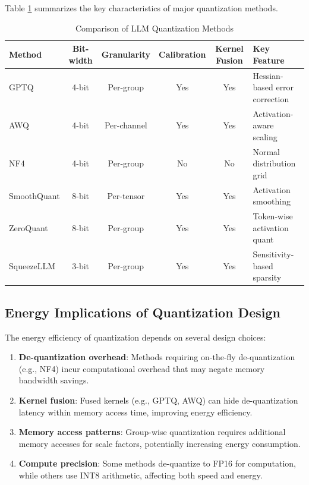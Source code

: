 \documentclass[11pt]{article}
\begin{document}
Table \ref{tab:quant_comparison} summarizes the key characteristics of major quantization methods.

\begin{table}[t]
\centering
\caption{Comparison of LLM Quantization Methods}
\label{tab:quant_comparison}
\begin{tabular}{lccccl}
\toprule
\textbf{Method} & \textbf{Bit-width} & \textbf{Granularity} & \textbf{Calibration} & \textbf{Kernel Fusion} & \textbf{Key Feature} \\
\midrule
GPTQ & 4-bit & Per-group & Yes & Yes & Hessian-based error correction \\
AWQ & 4-bit & Per-channel & Yes & Yes & Activation-aware scaling \\
NF4 & 4-bit & Per-group & No & No & Normal distribution grid \\
SmoothQuant & 8-bit & Per-tensor & Yes & Yes & Activation smoothing \\
ZeroQuant & 8-bit & Per-group & Yes & Yes & Token-wise activation quant \\
SqueezeLLM & 3-bit & Per-group & Yes & Yes & Sensitivity-based sparsity \\
\bottomrule
\end{tabular}
\end{table}

\subsection{Energy Implications of Quantization Design}

The energy efficiency of quantization depends on several design choices:

\begin{enumerate}
    \item \textbf{De-quantization overhead}: Methods requiring on-the-fly de-quantization (e.g., NF4) incur computational overhead that may negate memory bandwidth savings.
    
    \item \textbf{Kernel fusion}: Fused kernels (e.g., GPTQ, AWQ) can hide de-quantization latency within memory access time, improving energy efficiency.
    
    \item \textbf{Memory access patterns}: Group-wise quantization requires additional memory accesses for scale factors, potentially increasing energy consumption.
    
    \item \textbf{Compute precision}: Some methods de-quantize to FP16 for computation, while others use INT8 arithmetic, affecting both speed and energy.
\end{enumerate}
\end{document}
